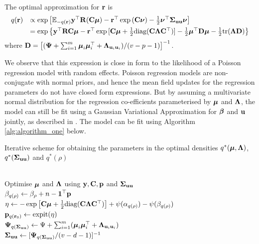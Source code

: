 
The optimal approximation  for
${\bf r}$ is
\[
\begin{array}{rl}
	q({\bf r}) & \propto \exp \left [ {\mathbb E}_{-q({\bf r})}{\bf y}^\top{\bf R}({\bf C}{\boldsymbol \mu}) - {\bf r}^\top\exp{({\bf C}{\boldsymbol\nu})}-\frac{1}{2} {\boldsymbol \nu}^\top {\boldsymbol\Sigma}_{{\bf u} {\bf u}} {\boldsymbol \nu} \right ]                                                  \\ [1ex]
	       & = \exp{ \left\{ {\bf y}^\top{\bf R}{\bf C}{\boldsymbol\mu}- {\bf r}^\top \exp{[{\bf C}{\boldsymbol\mu}+ \frac{1}{2} \text{diag}({\bf C}{\boldsymbol\Lambda}{\bf C}^\top)]} - \frac{1}{2} {\boldsymbol\mu}^\top {\bf D}{\boldsymbol\mu}- \frac{1}{2} \text{tr}({\boldsymbol\Lambda}{\bf D}) \right\} } 
\end{array}
\]
\noindent where ${\bf D} = \left[ ({\boldsymbol \Psi} + \sum_{i=1}^m {\boldsymbol \mu}_i {\boldsymbol \mu}_i^\top + {\boldsymbol \Lambda}_{{\bf u}_i{\bf u}_i}) / (v - p - 1) \right]^{-1}$. 

We observe that this expression is close in form to the likelihood of a Poisson regression model with random
effects. Poisson regression models are non-conjugate with normal priors, and hence the mean field updates for
the regression parameters do not have closed form expressions. But by assuming a multivariate normal
distribution for the regression co-efficients parameterised by ${\boldsymbol \mu}$ and ${\boldsymbol \Lambda}$, the model can still be
fit using a Gaussian Variational Approximation for ${\boldsymbol \beta}$ and ${\bf u}$ jointly, as described in
\citep{Ormerod2012}. The model can be fit using Algorithm \ref{alg:algorithm_one} below.

\begin{algorithm}
	\caption[Algorithm 1]{Iterative scheme for obtaining the parameters in the
		optimal densities $q^*({\boldsymbol \mu}, {\boldsymbol \Lambda})$, $q^*({\boldsymbol \Sigma}_{{\bf u} {\bf u}})$ and $q^*(\rho)$}
	\label{alg:algorithm_one}
	\begin{algorithmic}
		 \\[1ex]
			\STATE Optimise ${\boldsymbol \mu}$ and ${\boldsymbol \Lambda}$ using ${\bf y}, {\bf C}, {\bf p}$ and ${\boldsymbol \Sigma}_{{\bf u} {\bf u}}$ \\[1ex]
			\STATE $\beta_{q(\rho)} \leftarrow \beta_\rho + n - {\bf 1}^\top{\bf p}$ \\[1ex]
			\STATE $\eta \leftarrow -\exp \left [ {\bf C} {\boldsymbol \mu} + \frac{1}{2} \text{diag}{({\bf C}{\boldsymbol\Lambda}{\bf C}^\top)} \right ] + \psi{(\alpha_{q{(\rho)}})} - \psi{(\beta_{q{(\rho)}})}$ \\[1ex]
			\STATE ${\bf p}_{q({\bf r}_0)} \leftarrow \text{expit}{(\eta)}$ \\[1ex]
			\STATE ${\boldsymbol \Psi}_{q({\boldsymbol \Sigma}_{{\bf u} {\bf u}})} \leftarrow \Psi + \sum_{i=1}^m ({\boldsymbol \mu}_i {\boldsymbol \mu}_i^\top + {\boldsymbol \Lambda}_{{{\bf u}}_i {{\bf u}}_i})$ \\[1ex]
			\STATE ${\boldsymbol \Sigma}_{{\bf u}{\bf u}} \leftarrow [{\boldsymbol \Psi}_{q({\boldsymbol \Sigma}_{{\bf u} {\bf u}})}/(v - d - 1)]^{-1}$
		\ENDWHILE
	\end{algorithmic}
\end{algorithm}
						
